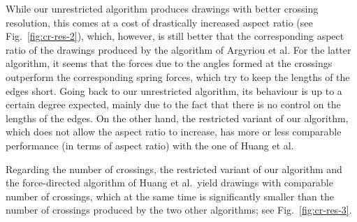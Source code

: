 \documentclass[runningheads]{llncs}
\begin{document}
While our unrestricted algorithm produces drawings with better crossing resolution, this comes at a cost of drastically increased aspect ratio (see Fig.~\ref{fig:cr-res-2}), which, however, is still better that the corresponding aspect ratio of the drawings produced by the algorithm of Argyriou et al. For the latter algorithm, it seems that the forces due to the angles formed at the crossings outperform the corresponding spring forces, which try to keep the lengths of the edges short. Going back to our unrestricted algorithm, its behaviour is up to a certain degree expected, mainly due to the fact that there is no control on the lengths of the edges.
On the other hand, the restricted variant of our algorithm, which does not allow the aspect ratio to increase, has more or less comparable performance (in terms of aspect ratio) with the one of Huang et al.

Regarding the number of crossings, the restricted variant of our algorithm and the force-directed algorithm of Huang et al.\ yield drawings with comparable number of crossings, which at the same time is significantly smaller than the  number of crossings produced by the two other algorithms; see Fig.~\ref{fig:cr-res-3}.
\end{document}
